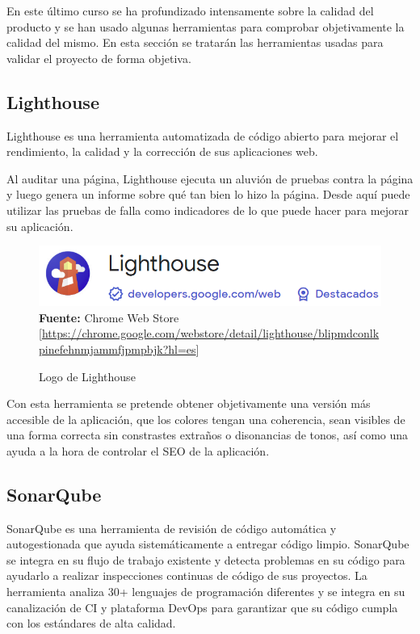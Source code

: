 En este último curso se ha profundizado intensamente sobre la calidad del
producto y se han usado algunas herramientas para comprobar objetivamente la
calidad del mismo. En esta sección se tratarán las herramientas usadas para
validar el proyecto de forma objetiva.

\subsection{Lighthouse}\label{lighthouse}
Lighthouse es una herramienta automatizada de código abierto para mejorar el
rendimiento, la calidad y la corrección de sus aplicaciones web.

Al auditar una página, Lighthouse ejecuta un aluvión de pruebas contra la
página y luego genera un informe sobre qué tan bien lo hizo la página. Desde
aquí puede utilizar las pruebas de falla como indicadores de lo que puede hacer
para mejorar su aplicación.\cite{lighthouse-resume}

\begin{figure}[htb!]
    \centering
    \caption{Logo de Lighthouse} \label{fig:lighthouse-logo}
    \centering
    \includegraphics[scale=0.35]{./Ilustraciones/logos/lighthouse-logo.png}\\
    \textbf{Fuente:} Chrome Web Store [\url{https://chrome.google.com/webstore/detail/lighthouse/blipmdconlkpinefehnmjammfjpmpbjk?hl=es}]
\end{figure}

Con esta herramienta se pretende obtener objetivamente una versión más
accesible de la aplicación, que los colores tengan una coherencia, sean
visibles de una forma correcta sin constrastes extraños o disonancias de tonos,
así como una ayuda a la hora de controlar el SEO de la aplicación.

\subsection{SonarQube}\label{sonarqube}
SonarQube es una herramienta de revisión de código automática y autogestionada
que ayuda sistemáticamente a entregar código limpio. SonarQube se integra en su
flujo de trabajo existente y detecta problemas en su código para ayudarlo a
realizar inspecciones continuas de código de sus proyectos. La herramienta
analiza 30+ lenguajes de programación diferentes y se integra en su
canalización de CI y plataforma DevOps para garantizar que su código cumpla con
los estándares de alta calidad\cite{sonarqube-resume}.

